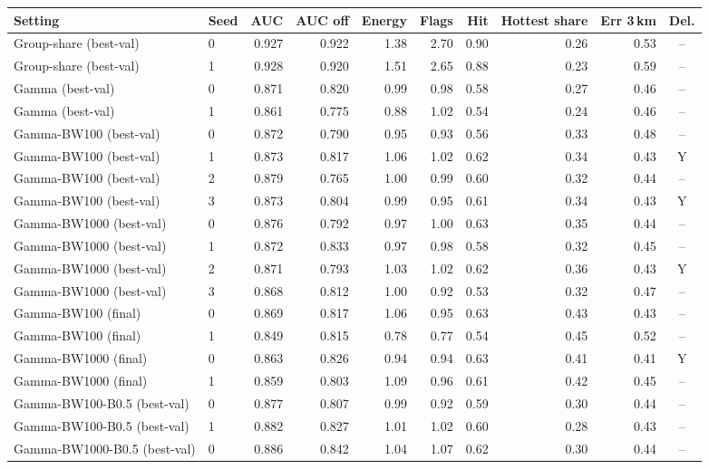 \begin{tabular}{llrrrrrrrc}
\toprule
Setting & Seed & AUC & AUC off & Energy & Flags & Hit & Hottest share & Err 3\,km & Del. \\
\midrule
Group-share (best-val) & 0 & 0.927 & 0.922 & 1.38 & 2.70 & 0.90 & 0.26 & 0.53 & -- \\
Group-share (best-val) & 1 & 0.928 & 0.920 & 1.51 & 2.65 & 0.88 & 0.23 & 0.59 & -- \\
Gamma (best-val) & 0 & 0.871 & 0.820 & 0.99 & 0.98 & 0.58 & 0.27 & 0.46 & -- \\
Gamma (best-val) & 1 & 0.861 & 0.775 & 0.88 & 1.02 & 0.54 & 0.24 & 0.46 & -- \\
Gamma-BW100 (best-val) & 0 & 0.872 & 0.790 & 0.95 & 0.93 & 0.56 & 0.33 & 0.48 & -- \\
Gamma-BW100 (best-val) & 1 & 0.873 & 0.817 & 1.06 & 1.02 & 0.62 & 0.34 & 0.43 & Y \\
Gamma-BW100 (best-val) & 2 & 0.879 & 0.765 & 1.00 & 0.99 & 0.60 & 0.32 & 0.44 & -- \\
Gamma-BW100 (best-val) & 3 & 0.873 & 0.804 & 0.99 & 0.95 & 0.61 & 0.34 & 0.43 & Y \\
Gamma-BW1000 (best-val) & 0 & 0.876 & 0.792 & 0.97 & 1.00 & 0.63 & 0.35 & 0.44 & -- \\
Gamma-BW1000 (best-val) & 1 & 0.872 & 0.833 & 0.97 & 0.98 & 0.58 & 0.32 & 0.45 & -- \\
Gamma-BW1000 (best-val) & 2 & 0.871 & 0.793 & 1.03 & 1.02 & 0.62 & 0.36 & 0.43 & Y \\
Gamma-BW1000 (best-val) & 3 & 0.868 & 0.812 & 1.00 & 0.92 & 0.53 & 0.32 & 0.47 & -- \\
Gamma-BW100 (final) & 0 & 0.869 & 0.817 & 1.06 & 0.95 & 0.63 & 0.43 & 0.43 & -- \\
Gamma-BW100 (final) & 1 & 0.849 & 0.815 & 0.78 & 0.77 & 0.54 & 0.45 & 0.52 & -- \\
Gamma-BW1000 (final) & 0 & 0.863 & 0.826 & 0.94 & 0.94 & 0.63 & 0.41 & 0.41 & Y \\
Gamma-BW1000 (final) & 1 & 0.859 & 0.803 & 1.09 & 0.96 & 0.61 & 0.42 & 0.45 & -- \\
Gamma-BW100-B0.5 (best-val) & 0 & 0.877 & 0.807 & 0.99 & 0.92 & 0.59 & 0.30 & 0.44 & -- \\
Gamma-BW100-B0.5 (best-val) & 1 & 0.882 & 0.827 & 1.01 & 1.02 & 0.60 & 0.28 & 0.43 & -- \\
Gamma-BW1000-B0.5 (best-val) & 0 & 0.886 & 0.842 & 1.04 & 1.07 & 0.62 & 0.30 & 0.44 & -- \\

\end{tabular}
